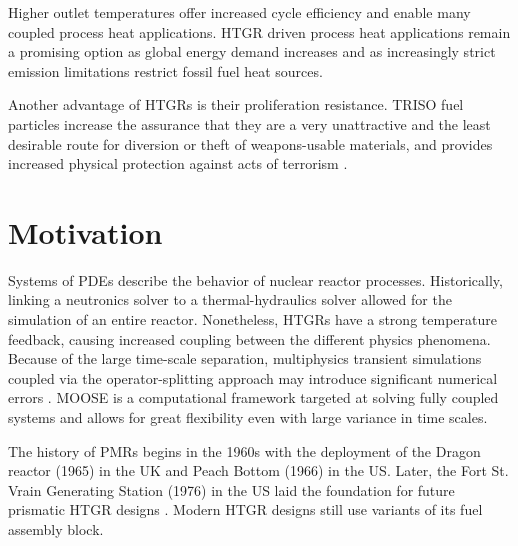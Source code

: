 \documentclass[11pt,letterpaper]{article}
\begin{document}
Higher outlet temperatures offer increased cycle efficiency and enable many coupled process heat applications.
HTGR driven process heat applications remain a promising option as global energy demand increases and as increasingly strict emission limitations restrict fossil fuel heat sources\cite{huning_steady_2014}.


Another advantage of \glspl{HTGR} is their proliferation resistance.
\gls{TRISO} fuel particles increase the assurance that they are a very unattractive and the least desirable route for diversion or theft of weapons-usable materials, and provides increased physical protection against acts of terrorism \cite{huning_steady_2014}.


\section{Motivation}


Systems of \glspl{PDE} describe the behavior of nuclear reactor processes.
Historically, linking a neutronics solver to a thermal-hydraulics solver allowed for the simulation of an entire reactor.
Nonetheless, \glspl{HTGR} have a strong temperature feedback, causing increased coupling between the different physics phenomena.
Because of the large time-scale separation, multiphysics transient simulations coupled via the operator-splitting approach may introduce significant numerical errors \cite{ragusa_consistent_2009} \cite{park_tightly_2010}.
\gls{MOOSE} \cite{gaston_moose_2009} is a computational framework targeted at solving fully coupled systems and allows for great flexibility even with large variance in time scales.


The history of \glspl{PMR} begins in the 1960s with the deployment of the Dragon reactor (1965) in the \gls{UK} and Peach Bottom (1966) in the \gls{US}.
Later, the Fort St. Vrain Generating Station (1976) in the \gls{US} laid the foundation for future prismatic \gls{HTGR} designs \cite{aris_iaea_general_2013}.
Modern \gls{HTGR} designs still use variants of its fuel assembly block.
\end{document}
